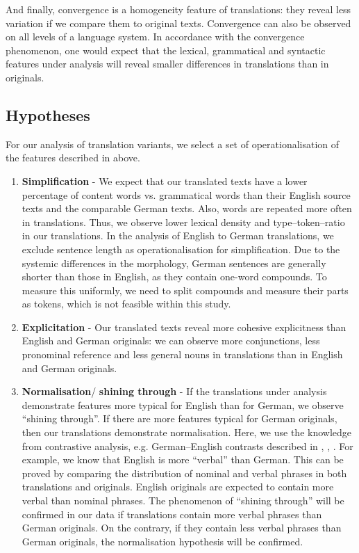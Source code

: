 \documentclass[output=paper]{LSP/langsci}
\begin{document}
And finally, convergence is a homogeneity feature of translations:  they reveal less variation if we compare them to original texts.  Convergence can also be observed on all levels of a language system. In accordance with the convergence phenomenon, one would expect that the lexical, grammatical and syntactic features under analysis will reveal smaller differences in translations than in originals.

\subsection{Hypotheses} \label{sec:4:2:3}

For our analysis of translation variants, we select a set of operationalisation of the features described in  above. 
 
\begin{enumerate}
\item \label{item:simplif} \textbf{Simplification} - We expect that our translated texts have a lower percentage of content words vs. grammatical words than their English source texts and the comparable German texts. Also, words are repeated more often in translations. Thus, we observe lower lexical density and type--token--ratio in our translations. In the analysis of English to German translations, we exclude sentence length as operationalisation for simplification. Due to the systemic differences in the morphology, German sentences are generally shorter than those in English, as they contain one-word compounds. To measure this uniformly, we need to split compounds and measure their parts as tokens, which is not feasible within this study.

\item \textbf{Explicitation} - Our translated texts reveal more cohesive explicitness than English and German originals: we can observe more conjunctions, less pronominal reference and less general nouns in translations than in English and German originals.

\item \label{item:norm} \textbf{Normalisation}/ \textbf{shining through} - If the translations under analysis demonstrate features more typical for English than for German, we observe “shining through”. If there are more features typical for German originals, then our translations demonstrate normalisation. Here, we use the knowledge from contrastive analysis, e.g. German--English contrasts described in \citet{Hawkins1986}, \citet{KoenigGast2007}, \citet{Steiner2012}. For example, we know that English is more “verbal” than German. This can be proved by comparing the distribution of nominal and verbal phrases in both translations and originals. English originals are expected to contain more verbal than nominal phrases. The phenomenon of “shining through” will be confirmed in our data if translations contain more verbal phrases than German originals. On the contrary, if they contain less verbal phrases than German originals, the normalisation hypothesis will be confirmed.


\end{enumerate}
\end{document}
